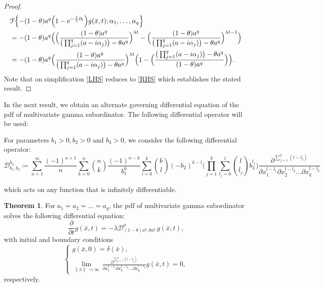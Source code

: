 \documentclass[12pt,oneside,reqno]{amsart}
\numberwithin{equation}{section}
\theoremstyle{definition}
\numberwithin{equation}{section}
\newtheorem{theorem}{\bf Theorem}[section]
\theoremstyle{remarkstyle}
\begin{document}
\begin{proof}
	\begin{align}\label{RHS}
		&\mathcal{F}\Bigl\{-(1-\theta)a^q\Big(1-e^{-\frac{1}{\lambda}\partial_t}\Big)g(\bar{x},t);\alpha_1,\dots,\alpha_q\Bigr\}\nonumber\\
		&=-(1-\theta)a^q \Big(\Big(\frac{(1-\theta)a^q}{\big(\prod_{j=1}^{q}(a-i\alpha_j)\big)-\theta a^q}\Big)^{\lambda t}-\Big(\frac{(1-\theta)a^q}{\big(\prod_{j=1}^{q}(a-i\alpha_j)\big)-\theta a^q}\Big)^{\lambda t-1}\Big)\nonumber\\
		&=-(1-\theta)a^q \Big(\frac{(1-\theta)a^q}{\big(\prod_{j=1}^{q}(a-i\alpha_j)\big)-\theta a^q}\Big)^{\lambda t}\Big(1-\Big(\frac{\big(\prod_{j=1}^{q}(a-i\alpha_j)\big)-\theta a^q}{(1-\theta)a^q}\Big)\Big).
	\end{align}
Note that on simplification \eqref{LHS} reduces to \eqref{RHS} which establishes the stated result.
\end{proof}
In the next result, we obtain an alternate governing differential equation of the pdf of multivariate gamma subordinator.
The following differential operator will be used:

For parameters $b_1>0,b_2>0$ and $b_3>0$, we consider the following differential operator:
{\footnotesize\begin{equation*}
	\mathcal{D}_{b_1,b_2}^{b_3}\coloneq\sum_{n=1}^{\infty}\frac{(-1)^{n+1}}{n} \sum_{k=0}^{n}{n\choose k}\frac{(-1)^{n-k}}{b_1^k}\sum_{l=0}^{k}{k\choose l}(-b_2)^{k-l}\Big(\prod_{j=1}^{q}\sum_{l_j=0}^{l}{l \choose l_j}b_3^{l_j}\Big)\frac{\partial^{\sum_{j=1}^{q}(l-l_j)}}{\partial x_1^{l-l_1}\partial x_2^{l-l_2}\dots\partial x_q^{l-l_q}}
\end{equation*}}

which acts on any function that is infinitely differentiable.

\begin{theorem}
For $a_1=a_2=\dots=a_q$, the pdf of multivariate gamma subordinator solves the following differential equation:
	\begin{equation}\label{de2}
		\frac{\partial}{\partial t}g(\bar{x}, t)=-\lambda \mathcal{D}_{(1-\theta)a^q,\theta a^q}^a\,g(\bar{x},t),
	\end{equation}
	with initial and boundary conditions
	\begin{equation}\label{ic_bc2}
		\begin{cases}
			g(\bar{x},0)=\delta (\bar{x}),\\
			\lim_{\|\bar{x}\|\to \infty}\,\frac{\partial^{\sum_{j=1}^{q}(l-l_j)}}{\partial x_1^{l-l_1}\partial x_2^{l-l_2}\dots\partial x_q^{l-l_q}}g(\bar{x},t)=0,
		\end{cases}
	\end{equation}
	respectively.
\end{theorem}
\end{document}
